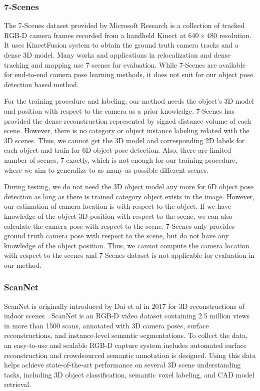 \subsubsection{7-Scenes}
The 7-Scenes dataset provided by Microsoft Research is a collection of tracked RGB-D camera frames recorded from a handheld Kinect at $640 \times 480$ resolution. It uses KinectFusion system to obtain the ground truth camera tracks and a dense 3D model. Many works and applications in relocalization \cite{shotton2013scene, glocker2013real, wu2017delving} and dense tracking and mapping use 7-scenes for evaluation. While 7-Scenes are available for end-to-end camera pose learning methods, it does not suit for our object pose detection based method.

For the training procedure and labeling, our method needs the object's 3D model and position with respect to the camera as a prior knowledge. 7-Scenes has provided the dense reconstruction represented by signed distance volume of each scene. However, there is no category or object instance labeling related with the 3D scenes. Thus, we cannot get the 3D model and corresponding 2D labels for each object and train for 6D object pose detection. Also, there are limited number of scenes, 7 exactly, which is not enough for our training procedure, where we aim to generalize to as many as possible different scenes. 

During testing, we do not need the 3D object model any more for 6D object pose detection as long as there is trained category object exists in the image. However, our estimation of camera location is with respect to the object. If we have knowledge of the object 3D position with respect to the scene, we can also calculate the camera pose with respect to the scene. 7-Scenes only provides ground truth camera pose with respect to the scene, but do not have any knowledge of the object position. Thus, we cannot compute the camera location with respect to the scenes and 7-Scenes dataset is not applicable for evaluation in our method.

\subsubsection{ScanNet}
ScanNet is originally introduced by Dai et al in 2017 for 3D reconstructions of indoor scenes \cite{dai2017scannet}. ScanNet is an RGB-D video dataset containing 2.5 million views in more than 1500 scans, annotated with 3D camera poses, surface reconstructions, and instance-level semantic segmentations. To collect the data, an easy-to-use and scalable RGB-D capture system includes automated surface reconstruction and crowdsourced semantic annotation is designed. Using this data helps achieve state-of-the-art performance on several 3D scene understanding tasks, including 3D object classification, semantic voxel labeling, and CAD model retrieval.

